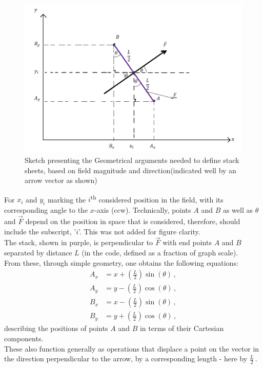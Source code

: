 \documentclass[11]{report}
\begin{document}
\begin{figure}[H]
	\centering
	\includegraphics[scale=0.4]{Documentation_images/Geometry of 1 stack sheet}
	\caption{Sketch presenting the Geometrical arguments needed to define stack sheets, based on field magnitude and direction(indicated well by an arrow vector as shown)}
	\label{fig:1 sheet}
\end{figure}
\noindent For \( x_i\) and \( y_i\) marking the $i$\textsuperscript{th}  considered position in the field, with its corresponding angle to the $x$-axis (ccw). Technically, points \(A\) and \(B\) as well as $\theta$ and $\vec F$ depend on the position in space that is considered, therefore, should include the subscript, '\(i \)'. This was not added for figure clarity. \\
The stack, shown in purple, is perpendicular to $\vec F$  with end points $A$ and $B$ separated by distance $L$ (in the code, defined as a fraction of graph scale).\\
From these, through simple geometry, one obtains the following equations:
\begin{equation}
\label{T1} \begin{split}
A_x &= x + \left( \frac{L}{2} \right) \sin( \theta)\,,\\
A_y &= y - \left( \frac{L}{2} \right) \cos( \theta)\,,\\
B_x &= x - \left( \frac{L}{2} \right) \sin( \theta)\,,\\
B_y &= y + \left( \frac{L}{2} \right) \cos( \theta)\,,
\end{split}
\end{equation}
describing the positions of points \(A\) and \(B\) in terms of their Cartesian components.\\
These also function generally as operations that displace a point on the vector in the direction perpendicular to the arrow, by a corresponding length - here by \( \frac{L}{2} \)\,. \\
\end{document}
